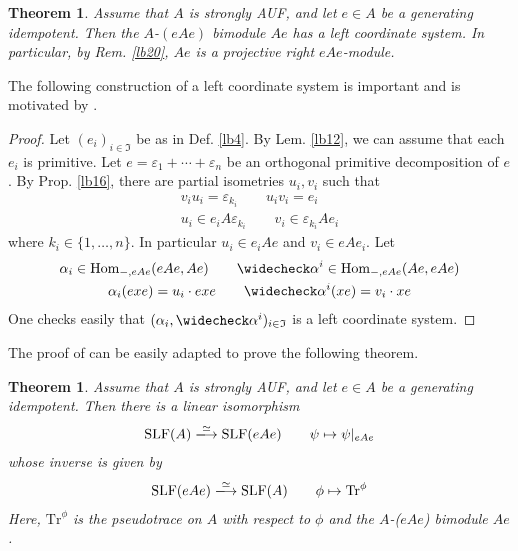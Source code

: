 \documentclass[11pt,b5paper,notitlepage]{article}
\theoremstyle{definition}
\theoremstyle{plain}
\newtheorem{thm}[df]{Theorem}
\newcommand{\fk}{\mathfrak}
\newcommand{\wch}{\widecheck}
\newcommand{\Tr}{\mathrm{Tr}}
\newcommand{\Hom}{\mathrm{Hom}}
\newcommand{\eps}{\varepsilon}
\newcommand{\SLF}{\mathrm{SLF}}
\numberwithin{equation}{section}
\begin{document}
\begin{thm}\label{lb17}
Assume that $A$ is strongly AUF, and let $e\in A$ be a generating idempotent. Then the $A$-$(eAe)$ bimodule $Ae$ has a left coordinate system. In particular, by Rem. \ref{lb20}, $Ae$ is a projective right $eAe$-module.
\end{thm}

The following construction of a left coordinate system is important and is motivated by \cite[Lem. 3.9]{Ari10}.


\begin{proof}
Let $(e_i)_{i\in\fk I}$ be as in Def. \ref{lb4}. By Lem. \ref{lb12}, we can assume that each $e_i$ is primitive. Let $e=\eps_1+\cdots+\eps_n$ be an orthogonal primitive decomposition of $e$. By Prop. \ref{lb16}, there are partial isometries $u_i,v_i$ such that
\begin{gather*}
v_iu_i=\eps_{k_i}\qquad u_iv_i=e_i\\
u_i\in e_iA\eps_{k_i}\qquad v_i\in \eps_{k_i}Ae_i
\end{gather*} 
where $k_i\in\{1,\dots,n\}$. In particular $u_i\in e_iAe$ and $v_i\in eAe_i$. Let
\begin{gather*}
\alpha_i\in\Hom_{-,eAe}(eAe,Ae)\qquad \wch\alpha^i\in\Hom_{-,eAe}(Ae,eAe) \\
\alpha_i(exe)=u_i\cdot exe\qquad \wch\alpha^i(xe)=v_i\cdot xe 
\end{gather*}
One checks easily that $(\alpha_i,\wch\alpha^i)_{i\in\fk I}$ is a left coordinate system.
\end{proof}


The proof of \cite[Thm. 3.10]{Ari10} can be easily adapted to prove the following theorem.

\begin{thm}\label{lb42}
Assume that $A$ is strongly AUF, and let $e\in A$ be a generating idempotent. Then there is a linear isomorphism
\begin{align*}
\SLF(A)\xlongrightarrow{\simeq} \SLF(eAe)\qquad \psi\mapsto \psi|_{eAe}
\end{align*}
whose inverse is given by
\begin{align*}
\SLF(eAe)\xlongrightarrow{\simeq}\SLF(A)\qquad \phi\mapsto \Tr^\phi
\end{align*}
Here, $\Tr^\phi$ is the pseudotrace on $A$ with respect to $\phi$ and the $A$-($eAe$) bimodule $Ae$.
\end{thm}
\end{document}
